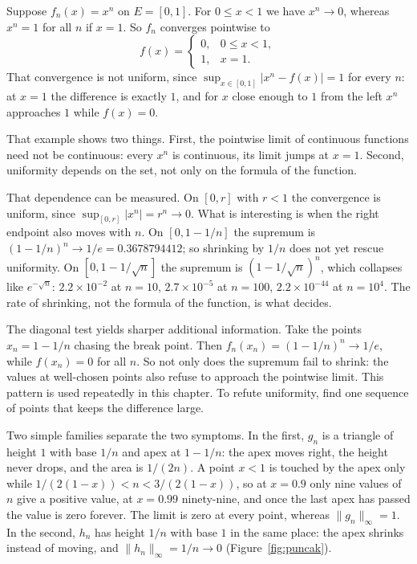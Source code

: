 \begin{contoh}
Suppose $f_n(x)=x^n$ on $E=[0,1]$. For $0\le x<1$ we have $x^n\to0$,
whereas $x^n=1$ for all $n$ if $x=1$. So $f_n$ converges pointwise
to
\[
  f(x)=\begin{cases}0, & 0\le x<1,\\ 1, & x=1.\end{cases}
\]
That convergence is not uniform, since $\sup_{x\in[0,1]}|x^n-f(x)|=1$ for
every $n$: at $x=1$ the difference is exactly $1$, and for $x$ close enough to $1$
from the left $x^n$ approaches $1$ while $f(x)=0$.
\end{contoh}

That example shows two things. First, the pointwise limit of continuous functions
need not be continuous: every $x^n$ is continuous, its limit jumps at $x=1$. Second,
uniformity depends on the set, not only on the formula of the function.

That dependence can be measured. On $[0,r]$ with $r<1$ the convergence is
uniform, since $\sup_{[0,r]}|x^n|=r^n\to0$. What is interesting is when the right
endpoint also moves with $n$. On $[0,1-1/n]$ the supremum is
$(1-1/n)^n\to1/e=0.3678794412$; so shrinking by $1/n$ does not yet
rescue uniformity. On $[0,1-1/\sqrt{n}]$ the supremum is
$(1-1/\sqrt n)^n$, which collapses like $e^{-\sqrt n}$: $2.2\times10^{-2}$ at
$n=10$, $2.7\times10^{-5}$ at $n=100$, $2.2\times10^{-44}$ at $n=10^4$. The rate
of shrinking, not the formula of the function, is what decides.

The diagonal test yields sharper additional information. Take the points
$x_n=1-1/n$ chasing the break point. Then $f_n(x_n)=(1-1/n)^n\to1/e$,
while $f(x_n)=0$ for all $n$. So not only does the supremum fail to
shrink: the values at well-chosen points also refuse to approach the
pointwise limit. This pattern is used repeatedly in this chapter. To
refute uniformity, find one sequence of points that keeps the difference
large.

Two simple families separate the two symptoms. In the first, $g_n$ is a
triangle of height $1$ with base $1/n$ and apex at $1-1/n$: the apex
moves right, the height never drops, and the area is $1/(2n)$. A point
$x<1$ is touched by the apex only while $1/(2(1-x))<n<3/(2(1-x))$, so at $x=0.9$
only nine values of $n$ give a positive value, at $x=0.99$ ninety-nine,
and once the last apex has passed the value is zero forever. The limit is zero
at every point, whereas $\|g_n\|_\infty=1$. In the second, $h_n$ has height $1/n$
with base $1$ in the same place: the apex shrinks instead of moving, and
$\|h_n\|_\infty=1/n\to0$ (Figure~\ref{fig:puncak}).

